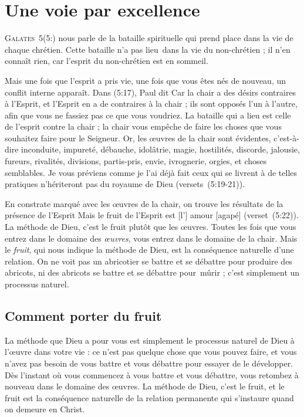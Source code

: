 \chapter{Une voie par excellence}

\lettrine{G}{alates~5}(5:) nous parle de
 la bataille spirituelle
 qui prend place dans la vie de chaque chrétien.
 Cette bataille n'a pas lieu~dans la vie du non-chrétien ;
 il n'en connaît rien, car l'esprit du non-chrétien est en sommeil.

Mais une fois que l'esprit a pris vie, une fois que vous êtes nés de nouveau,
 un conflit interne apparaît. Dans (5:17), Paul dit\frcolon{}
 \Og Car la chair a des désirs contraires à l'Esprit,
 et l'Esprit en a de contraires à la chair ; ils sont opposés l'un à l'autre,
 afin que vous ne fassiez pas ce que vous voudriez. \Fg{}
 La bataille qui a lieu est celle de l'esprit contre la chair ;
 la chair vous empêche de faire les choses que vous souhaitez
 faire pour le Seigneur.
 \Og Or, les œuvres de la chair sont évidentes, c'est-à-dire inconduite,
 impureté, débauche, idolâtrie, magie, hostilités, discorde, jalousie,
 fureurs, rivalités, divisions, partis-pris, envie, ivrognerie, orgies,
 et choses semblables. Je vous préviens comme je l'ai déjà fait\frcolon{}
 ceux qui se livrent à de telles pratiques n'hériteront pas
 du royaume de Dieu \Fg{} (versets~(5:19-21)).

En constrate marqué avec les œuvres de la chair, on trouve les résultats
 de la présence de l'Esprit\frcolon{} \Og Mais le fruit de l'Esprit est [l'] amour [agapé] \Fg{}
 (verset~(5:22)). La méthode de Dieu, c'est le fruit
 plutôt que les œuvres. Toutes les fois que vous entrez dans le domaine
 des \emph{œuvres}, vous entrez dans le domaine de la chair.
 Mais le \emph{fruit}, qui nous indique la méthode de Dieu, est la conséquence
 naturelle d'une relation. On ne voit pas un abricotier se battre et se débattre
 pour produire des abricots, ni des abricots se battre et se débattre
 pour~mûrir ; c'est simplement un processus naturel.


\section{Comment porter du fruit}

La méthode que Dieu a pour vous est simplement le processus naturel
 de Dieu à l'œuvre dans votre vie : ce n'est pas quelque chose
 que vous pouvez faire, et vous n'avez pas besoin de vous battre
 et vous débattre pour essayer de le développer.
 Dès l'instant où vous commencez à vous battre et vous débattre,
 vous retombez à nouveau dans le domaine des œuvres.
 La méthode de Dieu, c'est le fruit, et le fruit est la conséquence
 naturelle de la relation permanente qui s'instaure quand
 \Og on demeure en Christ. \Fg{}

